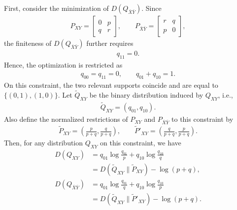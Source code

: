 \documentclass[journal,onecolumn]{IEEEtran}
\theoremstyle{definition}
\theoremstyle{remark}
\newcommand{\Dxy}{D({Q_{XY}})}
\newcommand{\Dbxby}{D({Q_{\bar{X}\bar{Y}}})}
\newcommand{\Qxy}{Q_{XY}}
\newcommand{\Pxy}{P_{XY}}
\newcommand{\Pbxby}{P_{\bar{X}\bar{Y}}}
\begin{document}
    First, consider the minimization of $\Dbxby$.
    Since
    \begin{align*}
        \Pxy
        =
        \begin{bmatrix}
            0 & p\\
            q & r
        \end{bmatrix},
        \qquad
        \Pbxby
        =
        \begin{bmatrix}
            r & q\\
            p & 0
        \end{bmatrix},
    \end{align*}
    the finiteness of $\Dbxby$ further requires
    \begin{align*}
        q_{11}=0.
    \end{align*}
    Hence, the optimization is restricted as
    \begin{align*}
        q_{00}=q_{11}=0,
        \qquad
        q_{01}+q_{10}=1.
    \end{align*}
    On this constraint, the two relevant supports coincide and are equal to $\{(0,1),(1,0)\}$.
    Let $\widetilde{Q}_{XY}$ be the binary distribution induced by $\Qxy$, i.e.,
    \begin{align*}
        \widetilde{Q}_{XY}
        =
        (q_{01},q_{10}).
    \end{align*}
    Also define the normalized restrictions of $\Pxy$ and $\Pbxby$ to this constraint by
    \begin{align*}
        \widetilde{P}_{XY}
        =
        \left(
            \frac{p}{p+q},
            \frac{q}{p+q}
        \right),
        \qquad
        \widetilde{P}'_{XY}
        =
        \left(
            \frac{q}{p+q},
            \frac{p}{p+q}
        \right).
    \end{align*}
    Then, for any distribution $\Qxy$ on this constraint, we have
    \begin{align*}
        \Dxy
        &=
        q_{01}\log\frac{q_{01}}{p}
        +
        q_{10}\log\frac{q_{10}}{q}
        \\
        &=
        D(\widetilde{Q}_{XY}\|\widetilde{P}_{XY})
        -
        \log(p+q),
        \\
        \Dbxby
        &=
        q_{01}\log\frac{q_{01}}{q}
        +
        q_{10}\log\frac{q_{10}}{p}
        \\
        &=
        D(\widetilde{Q}_{XY}\|\widetilde{P}'_{XY})
        -
        \log(p+q).
    \end{align*}
\end{document}
